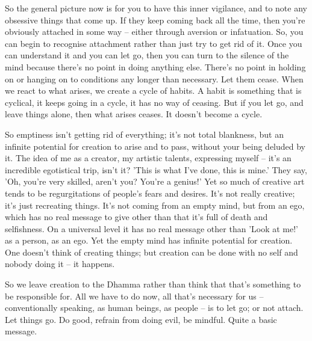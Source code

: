 So the general picture now is for you to have this inner vigilance, and to note any obsessive things that come up. If they keep coming back all the time, then you're obviously attached in some way -- either through aversion or infatuation. So, you can begin to recognise attachment rather than just try to get rid of it. Once you can understand it and you can let go, then you can turn to the silence of the mind because there's no point in doing anything else. There's no point in holding on or hanging on to conditions any longer than necessary. Let them cease. When we react to what arises, we create a cycle of habits. A habit is something that is cyclical, it keeps going in a cycle, it has no way of ceasing. But if you let go, and leave things alone, then what arises ceases. It doesn't become a cycle.

So emptiness isn't getting rid of everything; it's not total blankness, but an infinite potential for creation to arise and to pass, without your being deluded by it. The idea of me as a creator, my artistic talents, expressing myself -- it's an incredible egotistical trip, isn't it? 'This is what I've done, this is mine.' They say, 'Oh, you're very skilled, aren't you? You're a genius!' Yet so much of creative art tends to be regurgitations of people's fears and desires. It's not really creative; it's just recreating things. It's not coming from an empty mind, but from an ego, which has no real message to give other than that it's full of death and selfishness. On a universal level it has no real message other than 'Look at me!' as a person, as an ego. Yet the empty mind has infinite potential for creation. One doesn't think of creating things; but creation can be done with no self and nobody doing it -- it happens. 

So we leave creation to the Dhamma rather than think that that's something to be responsible for. All we have to do now, all that's necessary for us -- conventionally speaking, as human beings, as people -- is to let go; or not attach. Let things go. Do good, refrain from doing evil, be mindful. Quite a basic message.


